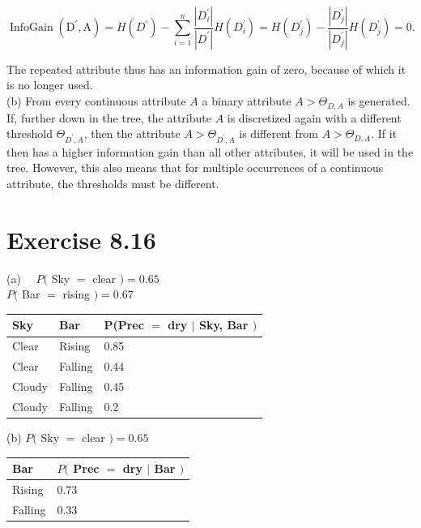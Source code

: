 \documentclass[10pt]{article}
\begin{document}
$$
\operatorname{InfoGain}\left(\mathrm{D}^{\prime}, \mathrm{A}\right)=H\left(D^{\prime}\right)-\sum_{i=1}^{n} \frac{\left|D_{i}^{\prime}\right|}{\left|D^{\prime}\right|} H\left(D_{i}^{\prime}\right)=H\left(D_{j}^{\prime}\right)-\frac{\left|D_{j}^{\prime}\right|}{\left|D_{j}^{\prime}\right|} H\left(D_{j}^{\prime}\right)=0 .
$$

The repeated attribute thus has an information gain of zero, because of which it is no longer used.\\
(b) From every continuous attribute $A$ a binary attribute $A>\Theta_{D, A}$ is generated. If, further down in the tree, the attribute $A$ is discretized again with a different threshold $\Theta_{D^{\prime}, A}$, then the attribute $A>\Theta_{D^{\prime}, A}$ is different from $A>\Theta_{D, A}$. If it then has a higher information gain than all other attributes, it will be used in the tree. However, this also means that for multiple occurrences of a continuous attribute, the thresholds must be different.

\section*{Exercise 8.16}
(a) $\quad P($ Sky $=$ clear $)=0.65$\\
$P($ Bar $=$ rising $)=0.67$

\begin{center}
\begin{tabular}{lll}
Sky & Bar & P(Prec $=$ dry $\mid$ Sky, Bar $)$ \\
\hline
Clear & Rising & 0.85 \\
\hline
Clear & Falling & 0.44 \\
\hline
Cloudy & Falling & 0.45 \\
\hline
Cloudy & Falling & 0.2 \\
\hline
\end{tabular}
\end{center}

(b) $P($ Sky $=$ clear $)=0.65$

\begin{center}
\begin{tabular}{ll}
\hline
Bar & $P($ Prec $=$ dry $\mid$ Bar $)$ \\
\hline
Rising & 0.73 \\
\hline
Falling & 0.33 \\
\hline
\end{tabular}
\end{center}
\end{document}
